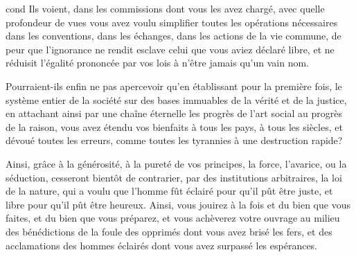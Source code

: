 \begin{displaycquote}[pp.~509-511]{cond}
  Ils voient, dans les commissions dont vous les avez chargé, avec
  quelle profondeur de vues vous avez voulu simplifier toutes les
  opérations nécessaires dans les conventions, dans les échanges, dans
  les actions de la vie commune, de peur que l'ignorance ne rendit
  esclave celui que vous aviez déclaré libre, et ne réduisit l'égalité
  prononcée par vos lois à n'être jamais qu'un vain nom.

  Pourraient-ils enfin ne pas apercevoir qu'en établissant pour la
  première fois, le système entier de la société sur des bases
  immuables de la vérité et de la justice, en attachant ainsi par une
  chaîne éternelle les progrès de l'art social au progrès de la
  raison, vous avez étendu vos bienfaits à tous les pays, à tous les
  siècles, et dévoué toutes les erreurs, comme toutes les tyrannies à
  une destruction rapide?

  Ainsi, grâce à la générosité, à la pureté de vos principes, la
  force, l'avarice, ou la séduction, cesseront bientôt de contrarier,
  par des institutions arbitraires, la loi de la nature, qui a voulu
  que l'homme fût éclairé pour qu'il pût être juste, et libre pour
  qu'il pût être heureux. Ainsi, vous jouirez à la fois et du bien que
  vous faites, et du bien que vous préparez, et vous achèverez votre
  ouvrage au milieu des bénédictions de la foule des opprimés dont
  vous avez brisé les fers, et des acclamations des hommes éclairés
  dont vous avez surpassé les espérances.
\end{displaycquote}
